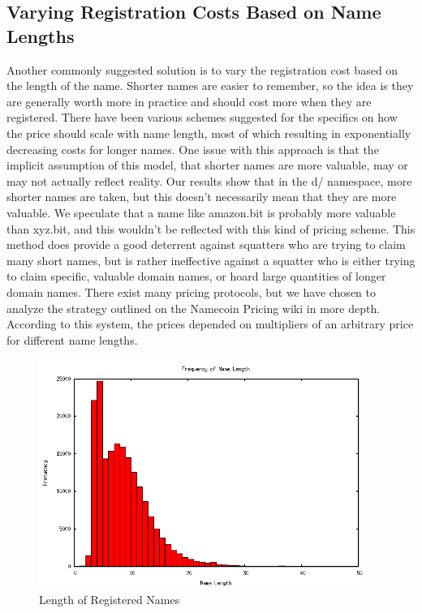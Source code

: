 \subsection{Varying Registration Costs Based on Name Lengths}
    Another commonly suggested solution is to vary the registration cost based on the length of the name. Shorter names are easier to remember, so the idea is they are generally worth more in practice and should cost more when they are registered. There have been various schemes suggested for the specifics on how the price should scale with name length, most of which resulting in exponentially decreasing costs for longer names. One issue with this approach is that the implicit assumption of this model, that shorter names are more valuable, may or may not actually reflect reality. Our results show that in the d/ namespace, more shorter names are taken, but this doesn't necessarily mean that they are more valuable. We speculate that a name like amazon.bit is probably more valuable than xyz.bit, and this wouldn't be reflected with this kind of pricing scheme.  This method does provide a good deterrent against squatters who are trying to claim many short names, but is rather ineffective against a squatter who is either trying to claim specific, valuable domain names, or hoard large quantities of longer domain names. 
    There exist many pricing protocols, but we have chosen to analyze the strategy outlined on the Namecoin Pricing wiki in more depth. According to this system, the prices depended on multipliers of an arbitrary price for different name lengths. 

\begin{figure}
  \centering
  \includegraphics[width=0.95\textwidth]{nameLength.png}
  \caption{Length of Registered Names}
  \label{fig:nameLength}
\end{figure}

